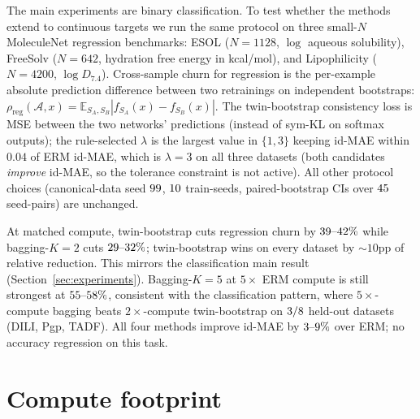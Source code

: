 The main experiments are binary classification.  To test whether
the methods extend to continuous targets we run the same protocol on
three small-$N$ MoleculeNet regression benchmarks: ESOL ($N{=}1128$,
$\log$ aqueous solubility), FreeSolv ($N{=}642$, hydration free
energy in kcal/mol), and Lipophilicity ($N{=}4200$, $\log D_{7.4}$).
Cross-sample churn for regression is the per-example absolute
prediction difference between two retrainings on independent bootstraps:
$\rho_{\mathrm{reg}}(\mathcal{A}, x) =
\mathbb{E}_{S_A, S_B}|f_{S_A}(x) - f_{S_B}(x)|$.  The
twin-bootstrap consistency loss is MSE between the two networks'
predictions (instead of sym-KL on softmax outputs); the rule-selected
$\lambda$ is the largest value in $\{1, 3\}$ keeping id-MAE within
$0.04$ of ERM id-MAE, which is $\lambda{=}3$ on all three datasets
(both candidates \emph{improve} id-MAE, so the tolerance constraint
is not active).  All other protocol choices (canonical-data seed
$99$, $10$ train-seeds, paired-bootstrap CIs over
$45$ seed-pairs) are unchanged.



At matched compute, twin-bootstrap cuts regression churn by
$39\text{--}42\%$ while bagging-$K{=}2$ cuts
$29\text{--}32\%$; twin-bootstrap wins on every
dataset by ${\sim}10$pp of relative reduction.  This mirrors the
classification main result (Section~\ref{sec:experiments}).
Bagging-$K{=}5$ at $5\times$ ERM compute is still strongest at
$55\text{--}58\%$, consistent with the classification pattern, where
$5\times$-compute bagging beats $2\times$-compute twin-bootstrap on
$3/8$ held-out
datasets (DILI, Pgp, TADF).  All four methods improve
id-MAE by $3\text{--}9\%$ over ERM;
no accuracy regression on this task.

\section{Compute footprint}
\label{app:compute}

